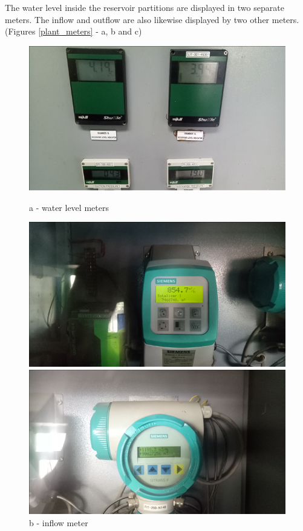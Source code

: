 The water level inside the reservoir partitions are displayed in two separate meters. The inflow and outflow are also likewise displayed by two other meters. (Figures \ref{plant_meters} - a, b and c)

\begin{figure} [!htb]
	\begin{minipage}[b]{0.3\linewidth}
		\centering
		\includegraphics[width=\textwidth]{figures/fig_ch043_water_level_meter}
		\caption*{a - water level meters}
		\label{ch043_water_level_meter}
	\end{minipage}
	\hspace{0.05cm}
	\begin{minipage}[b]{0.3\linewidth}
		\centering
		\includegraphics[width=\textwidth]{figures/fig_ch043_flowmeter1}
		\caption*{b - inflow meter}
		\label{ch043_flowmeter1}
	\end{minipage}
	\hspace{0.05cm}
	\begin{minipage}[b]{0.3\linewidth}
		\centering
		\includegraphics[width=\textwidth]{figures/fig_ch043_flowmeter2}

\end{minipage}
\end{figure}
